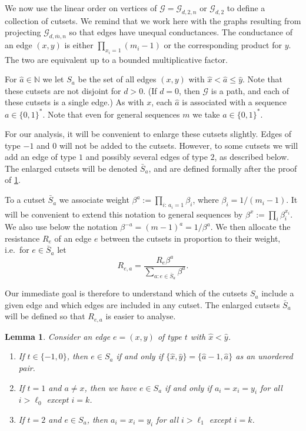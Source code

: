 \documentclass[12pt]{article}
\newtheorem{lemma}[thm]{Lemma}
\theoremstyle{definition}
\numberwithin{equation}{section}
\newcommand{\note}[1]{{\bf \textcolor{red}{[#1]}}}
\newcommand{\N}{\mathbb N}
\newcommand{\cG}{\mathcal{G}}
\renewcommand{\hat}{\widehat}
\newcommand{\mbar}{{\overline m}}
\begin{document}
We now use the linear order on vertices of $\cG = \cG_{d,2,n}$ or $\cG_{d,2}$ to define a collection of cutsets.
We remind that we work here with the graphs resulting from projecting $\cG_{d,\mbar,n}$ so that edges have unequal conductances.
The conductance of an edge $(x,y)$ is either $\prod_{x_i=1} (m_i-1)$ or the corresponding product for $y$.
The two are equivalent up to a bounded multiplicative factor.

For $\hat a\in \N$ we let $S_a$ be the set of all edges $(x,y)$ with $\hat x < \hat a\leq \hat y$.
Note that these cutsets are not disjoint for $d>0$.
(If $d=0$, then $\cG$ is a path, and each of these cutsets is a single edge.)
As with $x$, each $\hat a$ is associated with a sequence $a\in\{0,1\}^*$.
Note that even for general sequences $m$ we take $a\in\{0,1\}^*$.

For our analysis, it will be convenient to enlarge these cutsets slightly.
Edges of type $-1$ and $0$ will not be added to the cutsets.
However, to some cutsets we will add an edge of type $1$ and possibly several edges of type $2$, as described below.
The enlarged cutsets will be denoted $\bar{S}_a$, and are defined formally after the proof of \cref{L:e_in_Sa}.

To a cutset $\bar S_a$ we associate weight $\beta^a := \prod_{i: \, a_i=1}\beta_i$, where $\beta_i=1/(m_i-1)$.
It will be convenient to extend this notation to general sequences by $\beta^x := \prod_i \beta_i^{x_i}$.
We also use below the notation $\beta^{-a} = (m-1)^a = 1/\beta^a$.
We then allocate the resistance $R_e$ of an edge $e$ between the cutsets in proportion to their weight,
i.e.\ for $e\in \bar S_a$ let
\[
  R_{e,a} = \frac{R_e \beta^a}{\sum_{a : e\in \bar S_a} \beta^a}.
\]

Our immediate goal is therefore to understand which of the cutsets $S_a$ include a given edge and which edges are included in any cutset.
The enlarged cutsets $\bar{S}_a$ will be defined so that $R_{e,a}$ is easier to analyse.

\begin{lemma}\label{L:e_in_Sa}
  Consider an edge $e=(x,y)$ of type $t$ with $\hat x < \hat y$.
  \begin{enumerate}[nosep]
  \item If $t\in\{-1,0\}$, then $e\in S_a$ if and only if $\{\hat x,\hat y\} = \{\hat{a}-1, \hat a\}$ as an unordered pair.
  \item If $t=1$ and $a \neq x$, then we have $e\in S_a$ if and only if
    $a_i=x_i=y_i$ for all $i>\ell_0$ except $i=k$.
  \item If $t=2$ and $e\in S_a$, then $a_i=x_i=y_i$ for all $i>\ell_1$ except $i=k$.
  \end{enumerate}
\end{lemma}
\end{document}
